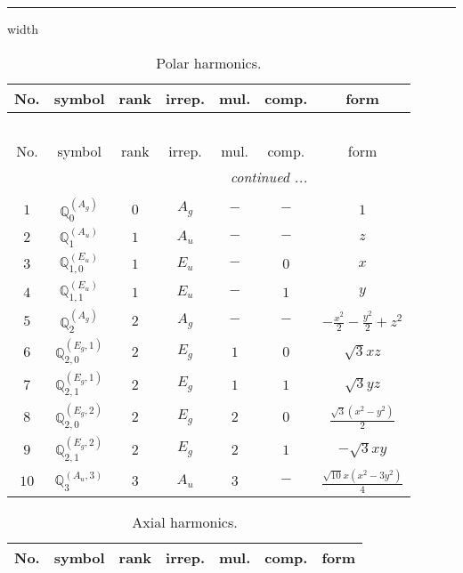 \documentclass[fleqn,10pt,landscape]{article}
\begin{document}
\begin{itemize}
 \hfil \hrule height 1mm width \textwidth \hfil

\begin{center}
\renewcommand{\arraystretch}{1.3}
\begin{longtable}{ccccccc}
\caption{Polar harmonics.}
 \\
 \hline \hline
No. & symbol & rank & irrep. & mul. & comp. & form \\ \hline \endfirsthead

\multicolumn{6}{l}{\tablename\ \thetable{}} \\
 \hline \hline
No. & symbol & rank & irrep. & mul. & comp. & form \\ \hline \endhead

 \hline \hline
\multicolumn{6}{r}{\footnotesize\it continued ...} \\ \endfoot

 \hline \hline
\multicolumn{6}{r}{} \\ \endlastfoot

$ 1 $ & $ \mathbb{Q}_{0}^{(A_{g})} $ & $ 0 $ & $ A_{g} $ & $ - $ & $ - $ & $ 1 $ \\ \hline
$ 2 $ & $ \mathbb{Q}_{1}^{(A_{u})} $ & $ 1 $ & $ A_{u} $ & $ - $ & $ - $ & $ z $ \\
$ 3 $ & $ \mathbb{Q}_{1,0}^{(E_{u})} $ & $ 1 $ & $ E_{u} $ & $ - $ & $ 0 $ & $ x $ \\
$ 4 $ & $ \mathbb{Q}_{1,1}^{(E_{u})} $ & $ 1 $ & $ E_{u} $ & $ - $ & $ 1 $ & $ y $ \\ \hline
$ 5 $ & $ \mathbb{Q}_{2}^{(A_{g})} $ & $ 2 $ & $ A_{g} $ & $ - $ & $ - $ & $ - \frac{x^{2}}{2} - \frac{y^{2}}{2} + z^{2} $ \\
$ 6 $ & $ \mathbb{Q}_{2,0}^{(E_{g},1)} $ & $ 2 $ & $ E_{g} $ & $ 1 $ & $ 0 $ & $ \sqrt{3} x z $ \\
$ 7 $ & $ \mathbb{Q}_{2,1}^{(E_{g},1)} $ & $ 2 $ & $ E_{g} $ & $ 1 $ & $ 1 $ & $ \sqrt{3} y z $ \\
$ 8 $ & $ \mathbb{Q}_{2,0}^{(E_{g},2)} $ & $ 2 $ & $ E_{g} $ & $ 2 $ & $ 0 $ & $ \frac{\sqrt{3} \left(x^{2} - y^{2}\right)}{2} $ \\
$ 9 $ & $ \mathbb{Q}_{2,1}^{(E_{g},2)} $ & $ 2 $ & $ E_{g} $ & $ 2 $ & $ 1 $ & $ - \sqrt{3} x y $ \\ \hline
$ 10 $ & $ \mathbb{Q}_{3}^{(A_{u},3)} $ & $ 3 $ & $ A_{u} $ & $ 3 $ & $ - $ & $ \frac{\sqrt{10} x \left(x^{2} - 3 y^{2}\right)}{4} $ \\
\end{longtable}
\end{center}
\begin{center}
\renewcommand{\arraystretch}{1.3}
\begin{longtable}{ccccccc}
\caption{Axial harmonics.}
 \\
 \hline \hline
No. & symbol & rank & irrep. & mul. & comp. & form \\ \hline \endfirsthead


\end{longtable}
\end{center}
\end{itemize}
\end{document}
